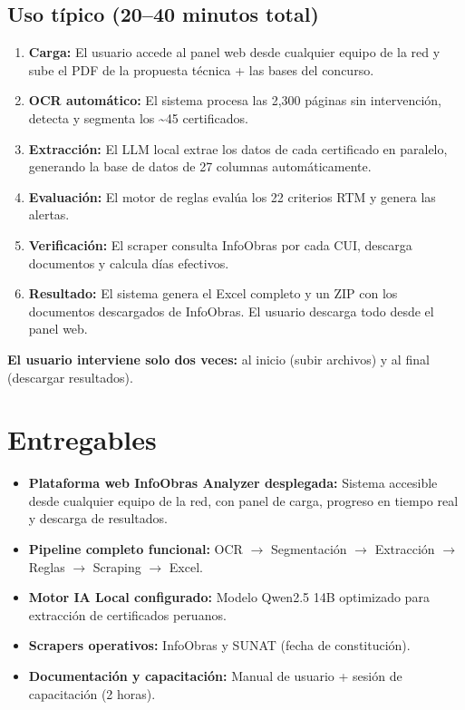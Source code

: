 \documentclass[11pt,a4paper]{article}
\begin{document}
\subsection{Uso típico (20--40 minutos total)}
\begin{enumerate}[leftmargin=*]
    \item \textbf{Carga:} El usuario accede al panel web desde cualquier equipo de la red y sube el PDF de la propuesta técnica + las bases del concurso.
    \item \textbf{OCR automático:} El sistema procesa las 2,300 páginas sin intervención, detecta y segmenta los \textasciitilde45 certificados.
    \item \textbf{Extracción:} El LLM local extrae los datos de cada certificado en paralelo, generando la base de datos de 27 columnas automáticamente.
    \item \textbf{Evaluación:} El motor de reglas evalúa los 22 criterios RTM y genera las alertas.
    \item \textbf{Verificación:} El scraper consulta InfoObras por cada CUI, descarga documentos y calcula días efectivos.
    \item \textbf{Resultado:} El sistema genera el Excel completo y un ZIP con los documentos descargados de InfoObras. El usuario descarga todo desde el panel web.
\end{enumerate}

\textbf{El usuario interviene solo dos veces:} al inicio (subir archivos) y al final (descargar resultados).













\newpage
\section{Entregables}

\begin{itemize}[leftmargin=*]
    \item \textbf{Plataforma web InfoObras Analyzer desplegada:} Sistema accesible desde cualquier equipo de la red, con panel de carga, progreso en tiempo real y descarga de resultados.
    \item \textbf{Pipeline completo funcional:} OCR $\rightarrow$ Segmentación $\rightarrow$ Extracción $\rightarrow$ Reglas $\rightarrow$ Scraping $\rightarrow$ Excel.
    \item \textbf{Motor IA Local configurado:} Modelo Qwen2.5 14B optimizado para extracción de certificados peruanos.
    \item \textbf{Scrapers operativos:} InfoObras y SUNAT (fecha de constitución).
    \item \textbf{Documentación y capacitación:} Manual de usuario + sesión de capacitación (2 horas).
\end{itemize}
\end{document}
